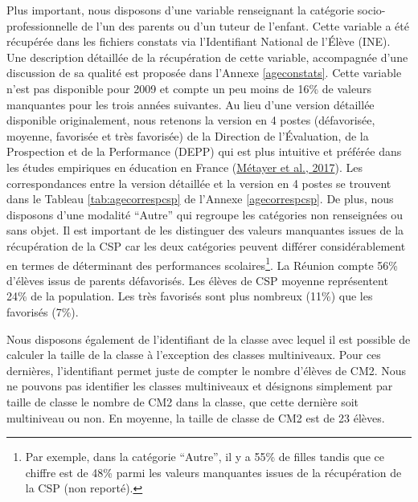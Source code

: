\documentclass[
]{book}
\begin{document}
\quad Plus important, nous disposons d'une variable renseignant la catégorie socio-professionnelle de l'un des parents ou d'un tuteur de l'enfant. Cette variable a été récupérée dans les fichiers constats via l'Identifiant National de l'Élève (INE). Une description détaillée de la récupération de cette variable, accompagnée d'une discussion de sa qualité est proposée dans l'Annexe \ref{ageconstats}. Cette variable n'est pas disponible pour 2009 et compte un peu moins de 16\% de valeurs manquantes pour les trois années suivantes. Au lieu d'une version détaillée disponible originalement, nous retenons la version en 4 postes (défavorisée, moyenne, favorisée et très favorisée) de la Direction de l'Évaluation, de la Prospection et de la Performance (DEPP) qui est plus intuitive et préférée dans les études empiriques en éducation en France (\protect\hyperlink{ref-MET:eal:17}{Métayer et al., 2017}). Les correspondances entre la version détaillée et la version en 4 postes se trouvent dans le Tableau \ref{tab:agecorrespcsp} de l'Annexe \ref{agecorrespcsp}. De plus, nous disposons d'une modalité ``Autre'' qui regroupe les catégories non renseignées ou sans objet. Il est important de les distinguer des valeurs manquantes issues de la récupération de la CSP car les deux catégories peuvent différer considérablement en termes de déterminant des performances scolaires\footnote{Par exemple, dans la catégorie ``Autre'', il y a 55\% de filles tandis que ce chiffre est de 48\% parmi les valeurs manquantes issues de la récupération de la CSP (non reporté).}. La Réunion compte 56\% d'élèves issus de parents défavorisés. Les élèves de CSP moyenne représentent 24\% de la population. Les très favorisés sont plus nombreux (11\%) que les favorisés (7\%).

\quad Nous disposons également de l'identifiant de la classe avec lequel il est possible de calculer la taille de la classe à l'exception des classes multiniveaux. Pour ces dernières, l'identifiant permet juste de compter le nombre d'élèves de CM2. Nous ne pouvons pas identifier les classes multiniveaux et désignons simplement par taille de classe le nombre de CM2 dans la classe, que cette dernière soit multiniveau ou non. En moyenne, la taille de classe de CM2 est de 23 élèves.
\end{document}
